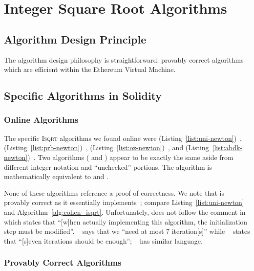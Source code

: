 \section{Integer Square Root Algorithms}

\subsection{Algorithm Design Principle}

The algorithm design philosophy is straightforward:
provably correct algorithms which are efficient within the
Ethereum Virtual Machine.

\subsection{Specific Algorithms in Solidity}

\subsubsection{Online Algorithms}

The specific \textsc{Isqrt} algorithms we found online were
\Uniswap{} (Listing~\ref{list:uni-newton})~\cite{uniswap-v2},
\prb{} (Listing~\ref{list:prb-newton})~\cite{prb-math},
\OpenZeppelin{} (Listing~\ref{list:oz-newton})~\cite{open-zeppelin}, and 
\abdk{} (Listing~\ref{list:abdk-newton})~\cite{abdk-consulting}.
Two algorithms (\prb{} and \abdk{})
appear to be exactly the same aside from different integer notation
and ``unchecked'' portions.
The \OpenZeppelin{} algorithm is mathematically equivalent
to \prb{} and \abdk{}.

None of these algorithms reference a proof of correctness.
We note that \Uniswap{}
is provably correct as it essentially
implements~\cite[Algorithm 1.7.1]{cohen1993};
compare Listing~\ref{list:uni-newton} and Algorithm~\ref{alg:cohen_isqrt}.
Unfortunately, \Uniswap{} does not follow the comment
in~\cite[Chapter 1.7, Remarks]{cohen1993} which states that
``[w]hen actually implementing this algorithm,
the initialization step must be modified''.
\OpenZeppelin{}~\cite{open-zeppelin}
says that we ``need at most 7 iteration[s]''
while  \abdk{}~\cite{abdk-consulting} states that
``[s]even iterations should be enough'';
\prb{}~\cite{prb-math} has similar language.






\subsubsection{Provably Correct Algorithms}


